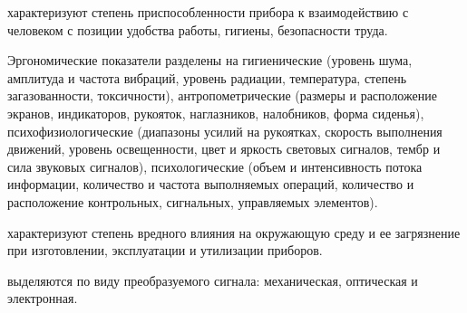  характеризуют степень приспособленности прибора к взаимодействию с человеком с позиции удобства работы, гигиены, безопасности труда. 

Эргономические показатели разделены на гигиенические (уровень шума, амплитуда и частота вибраций, уровень радиации, температура, степень загазованности, токсичности), антропометрические (размеры и расположение экранов, индикаторов, рукояток, наглазников, налобников, форма сиденья), психофизиологические (диапазоны усилий на рукоятках, скорость выполнения движений, уровень освещенности, цвет и яркость световых сигналов, тембр и сила звуковых сигналов), психологические (объем и интенсивность потока информации, количество и частота выполняемых операций, количество и расположение контрольных, сигнальных, управляемых элементов).

 характеризуют степень вредного влияния на окружающую среду и ее загрязнение при изготовлении, эксплуатации и утилизации приборов.

 выделяются по виду преобразуемого сигнала: механическая, оптическая и электронная.
